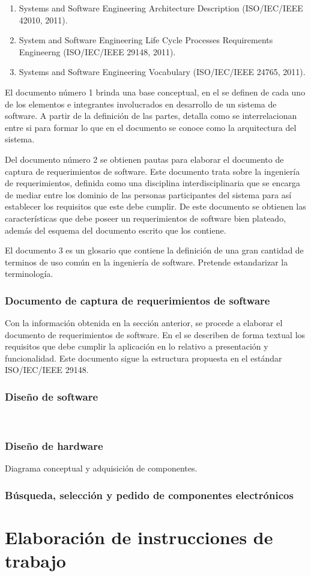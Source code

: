 \documentclass[paper=letter,oneside,fontsize=12pt, parskip=full]{article}
\begin{document}
	\begin{enumerate}  
		\item Systems and Software Engineering Architecture Description (ISO/IEC/IEEE 42010, 2011).		
		\item System and Software Engineering Life Cycle Processes Requirements Engineerng (ISO/IEC/IEEE 29148, 2011).
		\item Systems and Software Engineering Vocabulary (ISO/IEC/IEEE 24765, 2011).	
	\end{enumerate}
	
	El documento número 1 brinda una base conceptual, en el se definen de cada uno de los elementos e integrantes involucrados en desarrollo de un sistema de software. A partir de la definición de las partes, detalla como se interrelacionan entre si para formar lo que en el documento se conoce como la arquitectura del sistema. 
	
	Del documento número 2 se obtienen pautas para elaborar el documento de captura de requerimientos de software. Este documento trata sobre la ingeniería de requerimientos, definida como una disciplina interdisciplinaria que se encarga de mediar entre los dominio de las personas participantes del sistema para así establecer los requisitos que este debe cumplir. De este documento se obtienen las características que debe poseer un requerimientos de software bien plateado, además del esquema del documento escrito que los contiene.
	
	El documento 3 es un glosario que contiene la definición de una gran cantidad de terminos de uso común en la ingeniería de software. Pretende estandarizar la terminología.	

	\subsubsection{Documento de captura de requerimientos de software}
	
	Con la información obtenida en la sección anterior, se procede a elaborar el documento de requerimientos de software. En el se describen de forma textual los requisitos que debe cumplir la aplicación en lo relativo a presentación y funcionalidad. Este documento sigue la estructura propuesta en el estándar ISO/IEC/IEEE 29148.
	
	\subsubsection{Diseño de software}
	
	\
	
	\subsubsection{Diseño de hardware}	
	
	Diagrama conceptual y adquisición de componentes.
	
	\subsubsection{Búsqueda, selección y pedido de componentes electrónicos}
	
	\section{Elaboración de instrucciones de trabajo}

	
\end{document}
